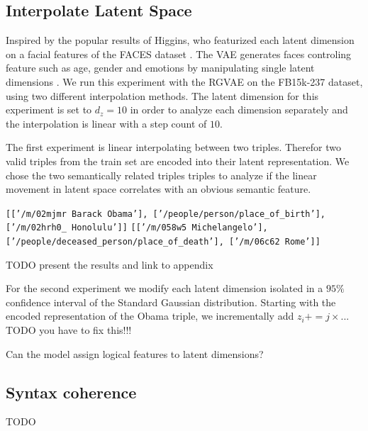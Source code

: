 \subsection{Interpolate Latent Space}

Inspired by the popular results of Higgins, who featurized each latent dimension on a facial features of the FACES dataset \cite{FACES}. The VAE generates faces controling feature such as age, gender and emotions by manipulating single latent dimensions \cite{higgins_beta-vae_2016}.  We run this experiment with the RGVAE on the FB15k-237 dataset, using two different interpolation methods. The latent dimension for this experiment is set to $d_{z}=10$ in order to analyze each dimension separately and the interpolation is linear with a step count of $10$.

The first experiment is linear interpolating between two triples. Therefor two valid triples from the train set are encoded into their latent representation. We chose the two semantically related triples triples to analyze if the linear movement in latent space correlates with an obvious semantic feature. 

\begin{center}
  \texttt{[['/m/02mjmr Barack Obama'], ['/people/person/place\_of\_birth'], ['/m/02hrh0\_	Honolulu']]}
  \texttt{[['/m/058w5 Michelangelo'], ['/people/deceased\_person/place\_of\_death'], ['/m/06c62	Rome']]}
\end{center}


TODO present the results and link to appendix



For the second experiment we modify each latent dimension isolated in a $95\%$ confidence interval of the Standard Gaussian distribution. Starting with the encoded representation of the Obama triple, we incrementally add $z_{i} += j \times ...$ TODO you have to fix this!!!



Can the model assign logical features to latent dimensions?


\subsection{Syntax coherence}
\label{ssec5:syntax}

TODO

